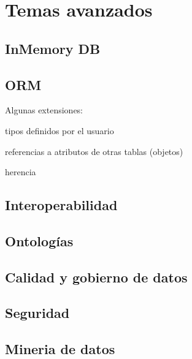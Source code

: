 \chapter{Temas avanzados}

\section{InMemory DB}

\section{ORM}

Algunas extensiones:

tipos definidos por el usuario

referencias a atributos de otras tablas (objetos)

herencia

\section{Interoperabilidad}

\section{Ontologías}

\section{Calidad y gobierno de datos}

\section{Seguridad}

\section{Mineria de datos}
